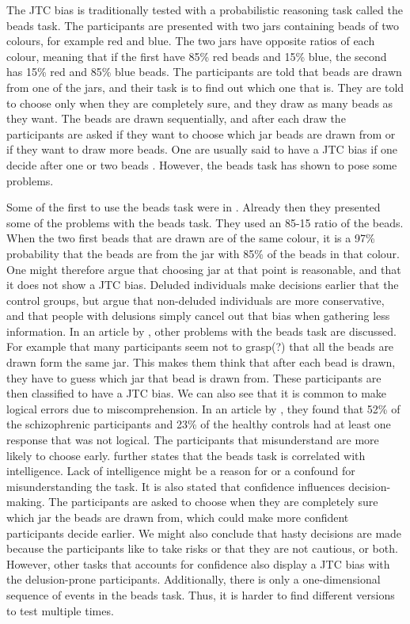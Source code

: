 The JTC bias is traditionally tested with a probabilistic reasoning task called the beads task. The participants are presented with two jars containing beads of two colours, for example red and blue. The two jars have opposite ratios of each colour, meaning that if the first have 85\% red beads and 15\% blue, the second has 15\% red and 85\% blue beads. The participants are told that beads are drawn from one of the jars, and their task is to find out which one that is. They are told to choose only when they are completely sure, and they draw as many beads as they want. The beads are drawn sequentially, and after each draw the participants are asked if they want to choose which jar beads are drawn from or if they want to draw more beads. One are usually said to have a JTC bias if one decide after one or two beads \citep{moritz2017}. However, the beads task has shown to pose some problems.

Some of the first to use the beads task were \citeauthor{huq1988} in \citeyear{huq1988}. Already then they presented some of the problems with the beads task. They used an 85-15 ratio of the beads. When the two first beads that are drawn are of the same colour, it is a 97\% probability that the beads are from the jar with 85\% of the beads in that colour. One might therefore argue that choosing jar at that point is reasonable, and that it does not show a JTC bias. Deluded individuals make decisions earlier that the control groups, but \citeauthor{huq1988} argue that non-deluded individuals are more conservative, and that people with delusions simply cancel out that bias when gathering less information. In an article by \citet{moritz2017}, other problems with the beads task are discussed. For example that many participants seem not to grasp(?) that all the beads are drawn form the same jar. This makes them think that after each bead is drawn, they have to guess which jar that bead is drawn from. These participants are then classified to have a JTC bias. We can also see that it is common to make logical errors due to miscomprehension. In an article by \citet{moritz2005}, they found that 52\% of the schizophrenic participants and 23\% of the healthy controls had at least one response that was not logical. The participants that misunderstand are more likely to choose early. \citeauthor{moritz2017} further states that the beads task is correlated with intelligence. Lack of intelligence might be a reason for or a confound for misunderstanding the task. It is also stated that confidence influences decision-making. The participants are asked to choose when they are completely sure which jar the beads are drawn from, which could make more confident participants decide earlier. We might also conclude that hasty decisions are made because the participants like to take risks or that they are not cautious, or both. However, other tasks that accounts for confidence also display a JTC bias with the delusion-prone participants. Additionally, there is only a one-dimensional sequence of events in the beads task. Thus, it is harder to find different versions to test multiple times. 

